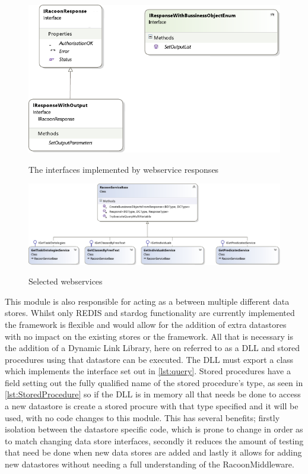  \begin{figure}
\myfloatalign
{\includegraphics[width=\linewidth]{gfx/Res}} 
\caption{The interfaces implemented by webservice responses}
\label{fig:ResponseInterfaces}
\end{figure}

 \begin{figure}
\myfloatalign
{\includegraphics[width=\linewidth]{gfx/RacoonServices}} 
\caption{Selected webservices}
\label{fig:services}
\end{figure}

This module is also responsible for acting as a  between multiple different data stores. Whilst only REDIS and stardog functionality are currently implemented the framework is flexible and would allow for the addition of extra datastores with no impact on the existing stores or the framework. All that is necessary is the addition of a Dynamic Link Library, here on referred to as a DLL and stored procedures using that datastore can be executed. The DLL must export a class which implements the interface set out in \autoref{lst:query}. Stored procedures have a field setting out the fully qualified name of the stored procedure's type, as seen in \autoref{lst:StoredProcedure} so if the DLL is in memory all that needs be done to access a new datastore is create a stored procure with that type specified and it will be used, with no code changes to this module. This has several benefits; firstly isolation between the datastore specific code, which is prone to change in order as to match changing data store interfaces, secondly it reduces the amount of testing that need be done when new data stores are added and lastly it allows for adding new datastores without needing a full understanding of the RacoonMiddleware.

